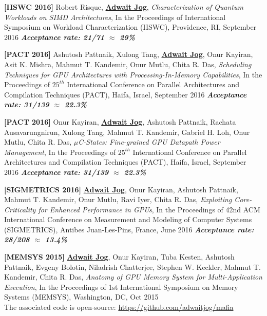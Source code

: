 \documentclass[10pt,a4]{article}
\begin{document}
\begin{description}
\item
{\bf [IISWC 2016]}
Robert Risque, {\bf \underline{Adwait Jog}}, 
{\it Characterization of Quantum Workloads on SIMD Architectures},
In the Proceedings of International Symposium on Workload Characterization (IISWC), Providence, RI, September 2016 
\textbf{\textit{Acceptance rate: 21/71 $\approx$ 29\%}}

\item
{\bf [PACT 2016]}
Ashutosh Pattnaik, Xulong Tang, {\bf \underline{Adwait Jog}}, Onur Kayiran, Asit K. Mishra, Mahmut T. Kandemir, 
Onur Mutlu, Chita R. Das, 
{\it Scheduling Techniques for GPU Architectures with Processing-In-Memory Capabilities},
In the Proceedings of $25^{th}$ International Conference on Parallel Architectures and Compilation Techniques (PACT), 
Haifa, Israel, September 2016 
\textbf{\textit{Acceptance rate: 31/139 $\approx$ 22.3\%}}

\item
{\bf [PACT 2016]}
Onur Kayiran, {\bf \underline{Adwait Jog}}, Ashutosh Pattnaik, Rachata Ausavarungnirun, Xulong Tang, Mahmut T. Kandemir, Gabriel H. Loh, Onur Mutlu, Chita R. Das, 
{\it $\mu$C-States: Fine-grained GPU Datapath Power Management},
In the Proceedings of $25^{th}$ International Conference on Parallel Architectures and Compilation Techniques (PACT), 
Haifa, Israel, September 2016 
\textbf{\textit{Acceptance rate: 31/139 $\approx$ 22.3\%}}

\item{\bf [SIGMETRICS 2016]} 
{\bf \underline{Adwait Jog}}, Onur Kayiran, Ashutosh Pattnaik, Mahmut T. Kandemir, 
Onur Mutlu, Ravi Iyer, Chita R. Das, {\it Exploiting Core-Criticality for Enhanced Performance in GPUs}, 
In the Proceedings of 42nd ACM International Conference on Measurement and Modeling of Computer Systems (SIGMETRICS), Antibes Juan-Les-Pins, France, June 2016 
\textbf{\textit{Acceptance rate: 28/208 $\approx$ 13.4\%}}

\item 
{\bf [MEMSYS 2015]}
{\bf \underline{Adwait Jog}}, Onur Kayiran, Tuba Kesten, Ashutosh Pattnaik, Evgeny Bolotin, Niladrish Chatterjee, 
Stephen W. Keckler, Mahmut T. Kandemir, Chita R. Das, 
{\it Anatomy of GPU Memory System for Multi-Application Execution}, 
In the Proceedings of 1st International Symposium on Memory Systems (MEMSYS), Washington, DC, Oct 2015 \\
The associated code is open-source: \url{https://github.com/adwaitjog/mafia}


\end{description}
\end{document}
